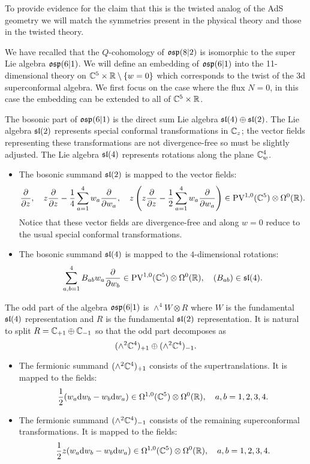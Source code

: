 \parsec[]

To provide evidence for the claim that this is the twisted analog of the AdS geometry we will match the symmetries present in the physical theory and those in the twisted theory. 

We have recalled that the $Q$-cohomology of $\mathfrak{osp}(8|2)$ is isomorphic to the super Lie algebra $\mathfrak{osp}(6|1)$. 
We will define an embedding of $\mathfrak{osp}(6|1)$ into the 11-dimensional theory on $\mathbb C^5 \times \mathbb R \setminus \{w=0\}$ which corresponds to the twist of the 3d superconformal algebra.
We first focus on the case where the flux $N=0$, in this case the embedding can be extended to all of $\mathbb C^5 \times \mathbb R$. 

\parsec[] 

The bosonic part of $\mathfrak{osp}(6|1)$ is the direct sum Lie algebra $\mathfrak{sl}(4) \oplus \mathfrak{sl}(2)$. 
The Lie algebra $\mathfrak{sl}(2)$ represents special conformal transformations in $\mathbb C_z$; the vector fields representing these transformations are not divergence-free so must be slightly adjusted. 
The Lie algebra $\mathfrak{sl}(4)$ represents rotations along the plane $\mathbb C^4_w$.   

\begin{itemize}
\item The bosonic summand $\mathfrak{sl}(2)$ is mapped to the vector fields:
\[
\frac{\partial}{\partial z} ,\quad z \frac{\partial}{\partial z} - \frac14 \sum_{a=1}^4 w_a \frac{\partial}{\partial w_a} , \quad z \left(z \frac{\partial}{\partial z} - \frac12 \sum_{a=1}^4 w_a \frac{\partial}{\partial w_a} \right) \in {\rm PV}^{1,0}(\mathbb C^5) \otimes \Omega^0(\mathbb R) .
\]
Notice that these vector fields are divergence-free and along $w=0$ reduce to the usual special conformal transformations.
\item The bosonic summand $\mathfrak{sl}(4)$ is mapped to the $4$-dimensional rotations: 
\[
\sum_{a,b=1}^4 B_{ab} w_a \frac{\partial}{\partial w_b} \in {\rm PV}^{1,0}(\mathbb C^5) \otimes \Omega^0(\mathbb R) , \quad (B_{ab}) \in \mathfrak{sl}(4) .
\]
\end{itemize}

The odd part of the algebra $\mathfrak{osp}(6|1)$ is $\wedge^4 W \otimes R$ where $W$ is the fundamental $\mathfrak{sl}(4)$ representation and $R$ is the fundamental $\mathfrak{sl}(2)$ representation. 
It is natural to split $R = \mathbb C_{+1} \oplus \mathbb C_{-1}$ so that the odd part decomposes as
\[
(\wedge^2 \mathbb C^4)_{+1} \oplus (\wedge^2 \mathbb C^4)_{-1} .
\]

\begin{itemize}
\item 
The fermionic summand $(\wedge^2 \mathbb C^4)_{+1}$ consists of the supertranslations. 
It is mapped to the fields: 
\[
\frac{1}{2} (w_a {\rm d} w_b - w_b {\rm d} w_a) \in \Omega^{1,0}(\mathbb C^5) \otimes \Omega^0(\mathbb R) , \quad a,b=1,2,3,4 .
\] 
\item The fermionic summand $(\wedge^2 \mathbb C^4)_{-1}$ consists of the remaining superconformal transformations. 
It is mapped to the fields: 
\[
\frac{1}{2} z (w_a {\rm d} w_b - w_b {\rm d} w_a) \in \Omega^{1,0}(\mathbb C^5) \otimes \Omega^0(\mathbb R) , \quad a,b=1,2,3,4. 
\] 
\end{itemize}


